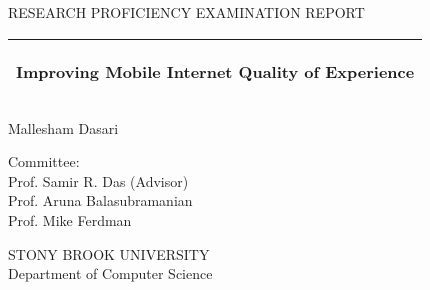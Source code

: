 %
%
%
%
%
\begin{titlepage}
  \addtolength{\hoffset}{0.5\evensidemargin-0.5\oddsidemargin} %
  \noindent%
\begin{center}
    {\Large
          RESEARCH PROFICIENCY EXAMINATION REPORT
         }\\
    \vspace{0.2cm}
     \end{center}
   \vspace{4 cm}
   \begin{tabular}{@{}p{\textwidth}@{}}
    \toprule[2pt]
    \midrule
    \vspace{0.2cm}
    \begin{center}
    \Huge{\textbf{
      Improving Mobile Internet Quality of Experience%
    }}
    \end{center}
    
    \vspace{0.2cm}\\
    \midrule
    \toprule[2pt]
  \end{tabular}
  
  \vspace{2 cm}
  \begin{center}
    {\Large
      Mallesham Dasari 
    }\\
      \vspace{2 cm}

    
    {\Large
      Committee:
      }\\
Prof. Samir R. Das (Advisor)\\
Prof. Aruna Balasubramanian\\
Prof. Mike Ferdman\\
    \vspace{0.2cm}
    \end{center}
  \vspace{2 cm}

  \begin{center}
STONY BROOK UNIVERSITY\\
Department of Computer Science\\
  \end{center}
\end{titlepage}
\clearpage
